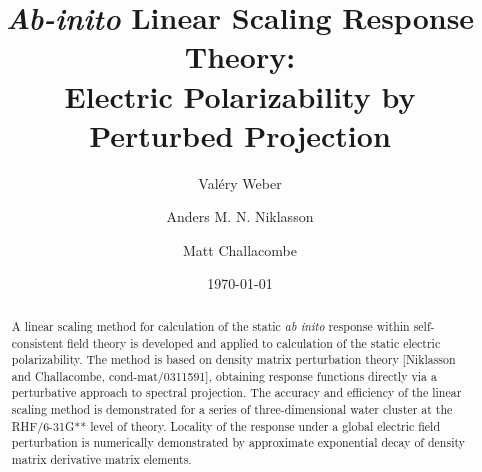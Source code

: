 \documentclass[prl,aps,twocolumn,showpacs,twocolumngrid,superbib]{revtex4}
\begin{document}
\title{\emph{Ab-inito} Linear Scaling Response Theory: \\ 
             Electric Polarizability by Perturbed Projection }

\author{Val\'ery Weber}
\author{Anders M. N. Niklasson}
\author{Matt Challacombe}

\date{\today}

\begin{abstract}
A linear scaling method for calculation of the static {\em ab inito} response within self-consistent field theory 
is developed and applied to calculation of the static electric polarizability.  The method is based on 
density matrix perturbation theory [Niklasson and Challacombe, cond-mat/0311591], obtaining  response functions
directly via a perturbative approach to spectral projection.
The accuracy and efficiency of the linear scaling method is demonstrated for a series of three-dimensional 
water cluster at the RHF/6-31G** level of theory.  Locality of the response under a global electric field 
perturbation is numerically demonstrated by approximate exponential decay of density matrix derivative matrix elements.
\end{abstract}

\maketitle

\end{document}
